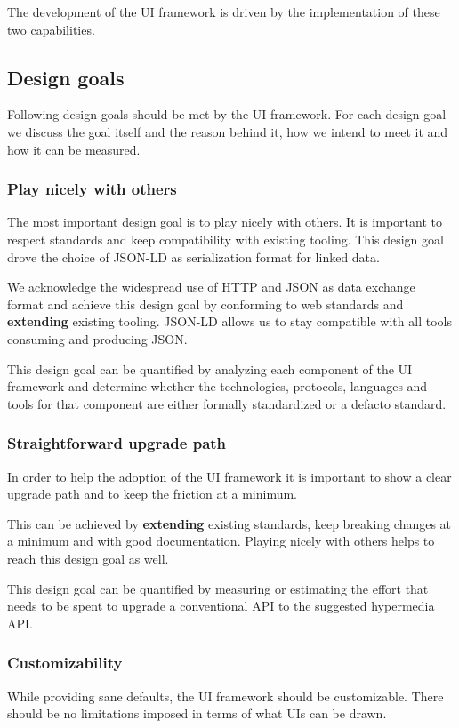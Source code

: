 The development of the UI framework is driven by the implementation of these two capabilities.

\subsection{Design goals}
Following design goals should be met by the UI framework. For each design goal we discuss the goal itself and the reason behind it, how we intend to meet it and how it can be measured.

\subsubsection{Play nicely with others}\label{usecases}
The most important design goal is to play nicely with others. It is important to respect standards and keep compatibility with existing tooling. This design goal drove the choice of JSON-LD as serialization format for linked data.

We acknowledge the widespread use of HTTP and JSON as data exchange format and achieve this design goal by conforming to web standards and \textbf{extending} existing tooling. JSON-LD allows us to stay compatible with all tools consuming and producing JSON.

This design goal can be quantified by analyzing each component of the UI framework and determine whether the technologies, protocols, languages and tools for that component are either formally standardized or a defacto standard.

\subsubsection{Straightforward upgrade path}\label{usecases}
In order to help the adoption of the UI framework it is important to show a clear upgrade path and to keep the friction at a minimum.

This can be achieved by \textbf{extending} existing standards, keep breaking changes at a minimum and with good documentation. Playing nicely with others helps to reach this design goal as well.

This design goal can be quantified by measuring or estimating the effort that needs to be spent to upgrade a conventional API to the suggested hypermedia API.

\subsubsection{Customizability}\label{usecases}
While providing sane defaults, the UI framework should be customizable. There should be no limitations imposed in terms of what UIs can be drawn.


